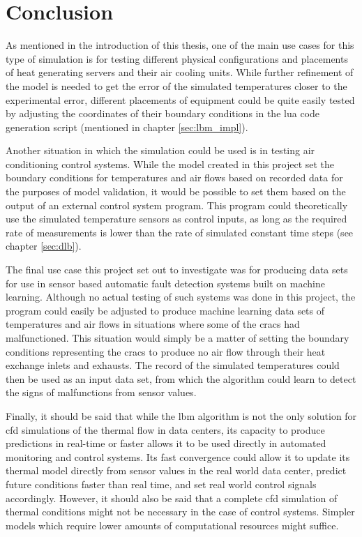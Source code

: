 \section{Conclusion}\label{sec:conclusion}
As mentioned in the introduction of this thesis, one of the main use cases for this type of simulation is for testing different physical configurations and placements of heat generating servers and their air cooling units. While further refinement of the model is needed to get the error of the simulated temperatures closer to the experimental error, different placements of equipment could be quite easily tested by adjusting the coordinates of their boundary conditions in the \gls{lua} code generation script (mentioned in chapter \ref{sec:lbm_impl}). 


Another situation in which the simulation could be used is in testing air conditioning control systems. While the model created in this project set the boundary conditions for temperatures and air flows based on recorded data for the purposes of model validation, it would be possible to set them based on the output of an external control system program. This program could theoretically use the simulated temperature sensors as control inputs, as long as the required rate of measurements is lower than the rate of simulated constant time steps (see chapter \ref{sec:dlb}).

The final use case this project set out to investigate was for producing data sets for use in sensor based automatic fault detection systems built on machine learning. Although no actual testing of such systems was done in this project, the program could easily be adjusted to produce machine learning data sets of temperatures and air flows in situations where some of the \gls{crac}s had malfunctioned. This situation would simply be a matter of setting the boundary conditions representing the \gls{crac}s to produce no air flow through their heat exchange inlets and exhausts. The record of the simulated temperatures could then be used as an input data set, from which the algorithm could learn to detect the signs of malfunctions from sensor values.

Finally, it should be said that while the \gls{lbm} algorithm is not the only solution for \gls{cfd} simulations of the thermal flow in data centers, its capacity to produce predictions in real-time or faster allows it to be used directly in automated monitoring and control systems. Its fast convergence could allow it to update its thermal model directly from sensor values in the real world data center, predict future conditions faster than real time, and set real world control signals accordingly. However, it should also be said that a complete \gls{cfd} simulation of thermal conditions might not be necessary in the case of control systems. Simpler models which require lower amounts of computational resources might suffice.

